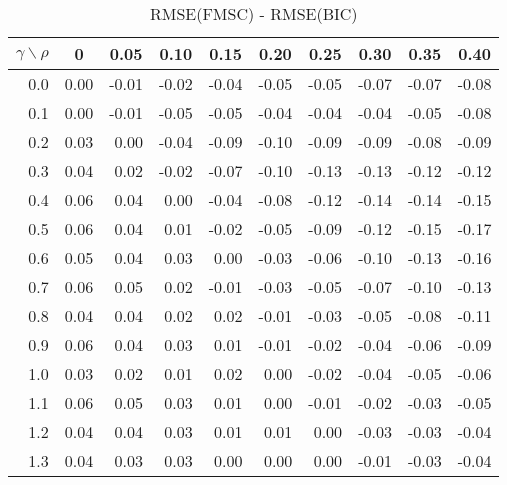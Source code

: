 \documentclass[12pt]{article}
\begin{document}
%
\begin{table}[!tbp]
\caption{RMSE(FMSC) - RMSE(BIC)}
 \begin{center}
 \begin{tabular}{r|rrrrrrrrr}\hline\hline
\multicolumn{1}{c|}{$\gamma\backslash\rho$}&\multicolumn{1}{c}{0}&\multicolumn{1}{c}{0.05}&\multicolumn{1}{c}{0.10}&\multicolumn{1}{c}{0.15}&\multicolumn{1}{c}{0.20}&\multicolumn{1}{c}{0.25}&\multicolumn{1}{c}{0.30}&\multicolumn{1}{c}{0.35}&\multicolumn{1}{c}{0.40}\tabularnewline
\hline
0.0&0.00&-0.01&-0.02&-0.04&-0.05&-0.05&-0.07&-0.07&-0.08\tabularnewline
0.1&0.00&-0.01&-0.05&-0.05&-0.04&-0.04&-0.04&-0.05&-0.08\tabularnewline
0.2&0.03& 0.00&-0.04&-0.09&-0.10&-0.09&-0.09&-0.08&-0.09\tabularnewline
0.3&0.04& 0.02&-0.02&-0.07&-0.10&-0.13&-0.13&-0.12&-0.12\tabularnewline
0.4&0.06& 0.04& 0.00&-0.04&-0.08&-0.12&-0.14&-0.14&-0.15\tabularnewline
0.5&0.06& 0.04& 0.01&-0.02&-0.05&-0.09&-0.12&-0.15&-0.17\tabularnewline
0.6&0.05& 0.04& 0.03& 0.00&-0.03&-0.06&-0.10&-0.13&-0.16\tabularnewline
0.7&0.06& 0.05& 0.02&-0.01&-0.03&-0.05&-0.07&-0.10&-0.13\tabularnewline
0.8&0.04& 0.04& 0.02& 0.02&-0.01&-0.03&-0.05&-0.08&-0.11\tabularnewline
0.9&0.06& 0.04& 0.03& 0.01&-0.01&-0.02&-0.04&-0.06&-0.09\tabularnewline
1.0&0.03& 0.02& 0.01& 0.02& 0.00&-0.02&-0.04&-0.05&-0.06\tabularnewline
1.1&0.06& 0.05& 0.03& 0.01& 0.00&-0.01&-0.02&-0.03&-0.05\tabularnewline
1.2&0.04& 0.04& 0.03& 0.01& 0.01& 0.00&-0.03&-0.03&-0.04\tabularnewline
1.3&0.04& 0.03& 0.03& 0.00& 0.00& 0.00&-0.01&-0.03&-0.04\tabularnewline
\hline
\end{tabular}

\end{center}

\end{table}
\end{document}

